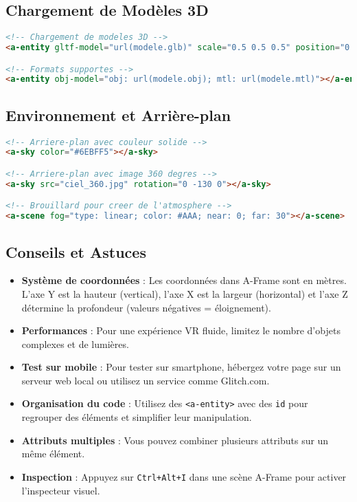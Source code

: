 \documentclass[12pt]{article}
\begin{document}
\subsection{Chargement de Modèles 3D}

\begin{lstlisting}[language=HTML]
<!-- Chargement de modeles 3D -->
<a-entity gltf-model="url(modele.glb)" scale="0.5 0.5 0.5" position="0 0 -5"></a-entity>

<!-- Formats supportes -->
<a-entity obj-model="obj: url(modele.obj); mtl: url(modele.mtl)"></a-entity>
\end{lstlisting}

\subsection{Environnement et Arrière-plan}

\begin{lstlisting}[language=HTML]
<!-- Arriere-plan avec couleur solide -->
<a-sky color="#6EBFF5"></a-sky>

<!-- Arriere-plan avec image 360 degres -->
<a-sky src="ciel_360.jpg" rotation="0 -130 0"></a-sky>

<!-- Brouillard pour creer de l'atmosphere -->
<a-scene fog="type: linear; color: #AAA; near: 0; far: 30"></a-scene>
\end{lstlisting}

\subsection{Conseils et Astuces}

\begin{itemize}
    \item \textbf{Système de coordonnées} : Les coordonnées dans A-Frame sont en mètres. L'axe Y est la hauteur (vertical), l'axe X est la largeur (horizontal) et l'axe Z détermine la profondeur (valeurs négatives = éloignement).
    
    \item \textbf{Performances} : Pour une expérience VR fluide, limitez le nombre d'objets complexes et de lumières.
    
    \item \textbf{Test sur mobile} : Pour tester sur smartphone, hébergez votre page sur un serveur web local ou utilisez un service comme Glitch.com.
    
    \item \textbf{Organisation du code} : Utilisez des \texttt{<a-entity>} avec des \texttt{id} pour regrouper des éléments et simplifier leur manipulation.
    
    \item \textbf{Attributs multiples} : Vous pouvez combiner plusieurs attributs sur un même élément.

    \item \textbf{Inspection} : Appuyez sur \texttt{Ctrl+Alt+I} dans une scène A-Frame pour activer l'inspecteur visuel.
\end{itemize}
\end{document}
